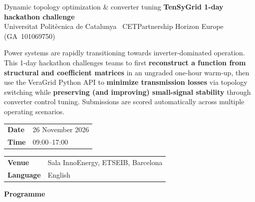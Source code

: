 \documentclass[11pt,a4paper]{article}
\newcommand{\eventdate}{26 November 2026}
\newcommand{\eventtime}{09:00--17:00}
\newcommand{\eventvenue}{Sala InnoEnergy, ETSEIB, Barcelona}
\newcommand{\eventlanguage}{English}
\begin{document}

  {Dynamic topology optimization \& converter tuning}
  {\textbf{TenSyGrid 1-day hackathon challenge}\\[1pt]
   {\footnotesize \color{tggrey}Universitat Polit\`ecnica de Catalunya \textperiodcentered\ CETPartnership Horizon Europe \mbox{(GA 101069750)}}}

\small
Power systems are rapidly transitioning towards inverter-dominated operation. This 1-day hackathon challenges teams
to first \textbf{reconstruct a function from structural and coefficient matrices} in an ungraded one-hour warm-up, then use the VeraGrid Python API to \textbf{minimize transmission losses} via topology switching while \textbf{preserving (and improving)
small-signal stability} through converter control tuning. Submissions are scored automatically across multiple operating scenarios.

\vspace{6pt}

\normalsize
\begin{minipage}[t]{0.48\textwidth}
  \renewcommand{\arraystretch}{1.25}
  \begin{tabularx}{\textwidth}{@{}lX@{}}
    \textbf{\color{tgblue}Date} & \eventdate \\
    \textbf{\color{tgblue}Time} & \eventtime \\
  \end{tabularx}
\end{minipage}
\hfill
\begin{minipage}[t]{0.48\textwidth}
  \renewcommand{\arraystretch}{1.25}
  \begin{tabularx}{\textwidth}{@{}lX@{}}
    \textbf{\color{tgblue}Venue} & \eventvenue \\
    \textbf{\color{tgblue}Language} & \eventlanguage \\
  \end{tabularx}
\end{minipage}

\vspace{10pt}
{\large\bfseries\color{tgblue}Programme}\par
\vspace{4pt}
\end{document}
